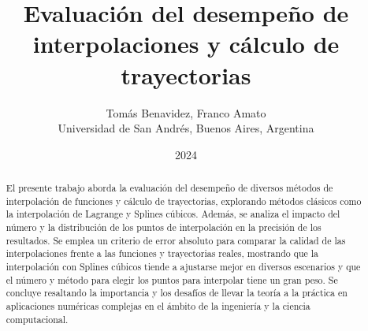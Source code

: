 \documentclass[12pt]{article} %
\title{Evaluación del desempeño de interpolaciones y cálculo de trayectorias}
\author{Tomás Benavidez, Franco Amato\\ [2mm] %
\small Universidad de San Andrés, Buenos Aires, Argentina}
\date{2024}
\begin{document}
\maketitle

\begin{abstract}
    El presente trabajo aborda la evaluación del desempeño de diversos métodos de interpolación de funciones y cálculo de trayectorias, explorando métodos clásicos como la interpolación de Lagrange y Splines cúbicos. Además, se analiza el impacto del número y la distribución de los puntos de interpolación en la precisión de los resultados. Se emplea un criterio de error absoluto para comparar la calidad de las interpolaciones frente a las funciones y trayectorias reales, mostrando que la interpolación con Splines cúbicos tiende a ajustarse mejor en diversos escenarios y que el número y método para elegir los puntos para interpolar tiene un gran peso. Se concluye resaltando la importancia y los desafíos de llevar la teoría a la práctica en aplicaciones numéricas complejas en el ámbito de la ingeniería y la ciencia computacional.
\end{abstract}

\vspace{0.1cm}
\end{document}
